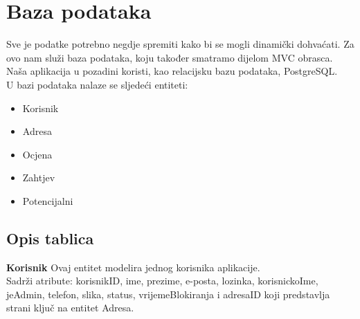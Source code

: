 			
			
			\section{Baza podataka}
			
			Sve je podatke potrebno negdje spremiti kako bi se mogli dinamički dohvaćati. Za ovo nam služi baza podataka, koju također smatramo dijelom MVC obrasca. Naša aplikacija u pozadini koristi, kao relacijsku bazu podataka, PostgreSQL.
			\\
			U bazi podataka nalaze se sljedeći entiteti:
			\begin{itemize}
				\item Korisnik
				\item Adresa
				\item Ocjena
				\item Zahtjev
				\item Potencijalni
			\end{itemize}
			
			\subsection{Opis tablica}
			
			
			\textbf{Korisnik} Ovaj entitet modelira jednog korisnika aplikacije.\\
			Sadrži atribute: korisnikID, ime, prezime, e-posta, lozinka, korisnickoIme, jeAdmin, telefon, slika, status, vrijemeBlokiranja i
			adresaID koji predstavlja strani ključ na entitet Adresa.
			
